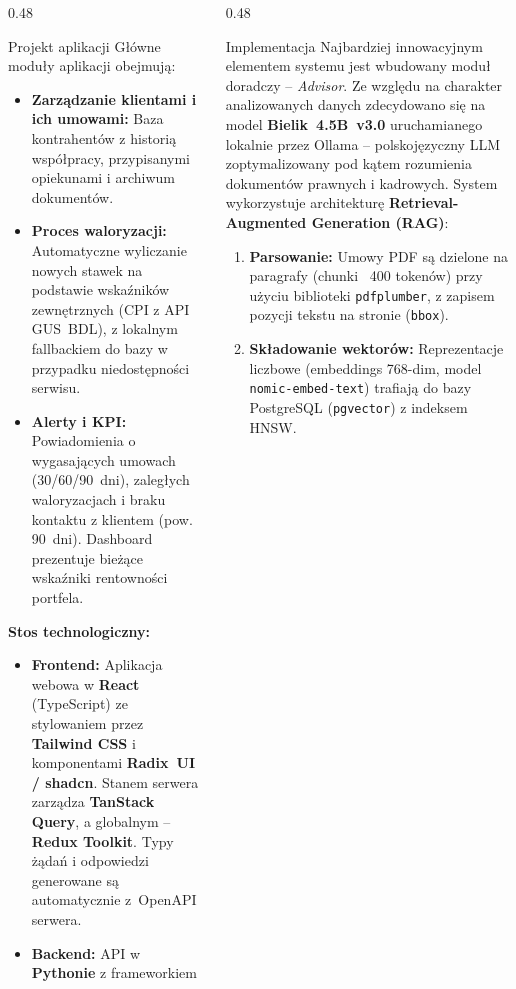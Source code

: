 \documentclass[final]{beamer} %
\begin{document}
\begin{frame}{}
\begin{columns}[T]
\begin{column}[T]{0.48\textwidth}
\begin{block}{Projekt aplikacji}
Główne moduły aplikacji obejmują:
\begin{itemize}
    \item \textbf{Zarządzanie klientami i ich umowami:} Baza kontrahentów z historią współpracy, przypisanymi opiekunami i archiwum dokumentów.
    \item \textbf{Proces waloryzacji:} Automatyczne wyliczanie nowych stawek na podstawie wskaźników zewnętrznych (CPI z API GUS~BDL), z lokalnym fallbackiem do bazy w przypadku niedostępności serwisu.
    \item \textbf{Alerty i KPI:} Powiadomienia o wygasających umowach (30/60/90~dni), zaległych waloryzacjach i braku kontaktu z klientem (pow. 90~dni). Dashboard prezentuje bieżące wskaźniki rentowności portfela.
\end{itemize}

\textbf{Stos technologiczny:}
\begin{itemize}
\item \textbf{Frontend:} Aplikacja webowa w \textbf{React} (TypeScript) ze stylowaniem przez \textbf{Tailwind CSS} i komponentami \textbf{Radix~UI / shadcn}. Stanem serwera zarządza \textbf{TanStack Query}, a globalnym -- \textbf{Redux Toolkit}. Typy żądań i odpowiedzi generowane są automatycznie z~OpenAPI serwera.
\item \textbf{Backend:} API w \textbf{Pythonie} z frameworkiem
\end{itemize}
\end{block}
\end{column}
\begin{column}[T]{0.48\textwidth}
\begin{block}{Implementacja}
Najbardziej innowacyjnym elementem systemu jest wbudowany moduł doradczy -- \textit{Advisor}. Ze względu na charakter analizowanych danych zdecydowano się na model \textbf{Bielik~4.5B~v3.0} uruchamianego lokalnie przez Ollama -- polskojęzyczny LLM zoptymalizowany pod kątem rozumienia dokumentów prawnych i kadrowych.
System wykorzystuje architekturę \textbf{Retrieval-Augmented Generation (RAG)}:
\begin{enumerate}
    \item \textbf{Parsowanie:} Umowy PDF są dzielone na paragrafy (chunki ~400 tokenów) przy użyciu biblioteki \texttt{pdfplumber}, z zapisem pozycji tekstu na stronie (\texttt{bbox}).
    \item \textbf{Składowanie wektorów:} Reprezentacje liczbowe (embeddings 768-dim, model \texttt{nomic-embed-text}) trafiają do bazy PostgreSQL (\texttt{pgvector}) z indeksem HNSW.

\end{enumerate}
\end{block}
\end{column}
\end{columns}
\end{frame}
\end{document}
